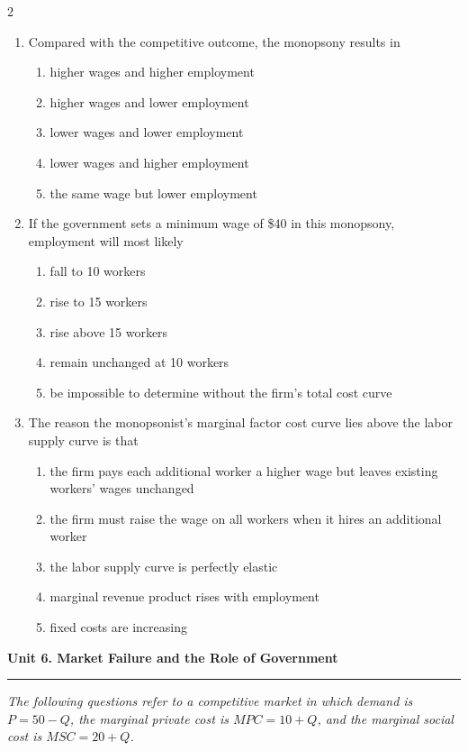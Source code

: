 \documentclass[10pt]{article}
\newenvironment{choiceslist}
  {\begin{enumerate}[label=(\Alph*), leftmargin=1.6em, itemsep=0.12em, topsep=0.18em, parsep=0pt]}
  {\end{enumerate}}
\newenvironment{stimulus}
  {\begin{center}\begin{minipage}{0.96\columnwidth}\footnotesize\itshape\setlength{\tabcolsep}{3pt}\renewcommand{\arraystretch}{0.96}}
  {\end{minipage}\end{center}}
\newcommand{\unitheader}[2]{%
  \vspace{0.35em}
  {\large\bfseries Unit #1. #2\par}
  \vspace{0.2em}
  \hrule
  \vspace{0.45em}
}
\begin{document}
\begin{multicols*}{2}
\begin{enumerate}[resume*=apq, leftmargin=*, itemsep=0.85em, topsep=0.2em, parsep=0pt]
\begin{choiceslist}
\item 20 workers and \$40
\end{choiceslist}
\item Compared with the competitive outcome, the monopsony results in
\begin{choiceslist}
\item higher wages and higher employment
\item higher wages and lower employment
\item lower wages and lower employment
\item lower wages and higher employment
\item the same wage but lower employment
\end{choiceslist}
\item If the government sets a minimum wage of \$40 in this monopsony, employment will most likely
\begin{choiceslist}
\item fall to 10 workers
\item rise to 15 workers
\item rise above 15 workers
\item remain unchanged at 10 workers
\item be impossible to determine without the firm's total cost curve
\end{choiceslist}
\item The reason the monopsonist's marginal factor cost curve lies above the labor supply curve is that
\begin{choiceslist}
\item the firm pays each additional worker a higher wage but leaves existing workers' wages unchanged
\item the firm must raise the wage on all workers when it hires an additional worker
\item the labor supply curve is perfectly elastic
\item marginal revenue product rises with employment
\item fixed costs are increasing
\end{choiceslist}
\end{enumerate}
\unitheader{6}{Market Failure and the Role of Government}
\begin{stimulus}
The following questions refer to a competitive market in which demand is $P = 50 - Q$, the marginal private cost is $MPC = 10 + Q$, and the marginal social cost is $MSC = 20 + Q$.
\end{stimulus}
\begin{enumerate}[resume*=apq, leftmargin=*, itemsep=0.85em, topsep=0.2em, parsep=0pt]

\end{enumerate}
\end{multicols*}
\end{document}
